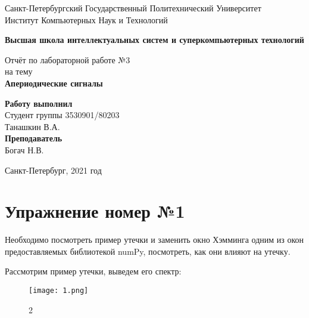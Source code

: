 ﻿\documentclass[10pt,a4paper,oneside]{article}
\begin{document}
\begin{titlepage}
\newpage
	\begin{center}
		\Large Санкт-Петербургский Государственный Политехнический Университет\\
		Институт Компьютерных Наук и Технологий\\
	\end{center}
	\begin{center}
		\large\textbf {Высшая школа интеллектуальных систем и суперкомпьютерных технологий}
	\end{center}
	
	\vspace{5em}
	\begin{center}
		\large{Отчёт по лабораторной работе №3 \\ на тему \\
		\textbf{Апериодические сигналы} }
	\end{center}
	
	\vspace{25em}
	\begin{flushright}
		\textbf{Работу выполнил\\}Студент группы 3530901/80203 \\ Танашкин В.А.\\
		\textbf{Преподаватель\\}Богач Н.В. 
	\end{flushright}
	
	\vspace{\fill}%
	\begin{center}
	Санкт-Петербург, 2021 год	
	\end{center}
\end{titlepage} %



\section{Упражнение номер №1}

Необходимо посмотреть пример утечки и заменить окно Хэмминга одним из окон предоставляемых библиотекой numPy, посмотреть, как они влияют на утечку. 

Рассмотрим пример утечки, выведем его спектр: 

\begin{figure}[H]
        \centering
        \texttt{[image: 1.png]}
        \caption{2}
        \label{fig:first}
\end{figure}
\end{document}
